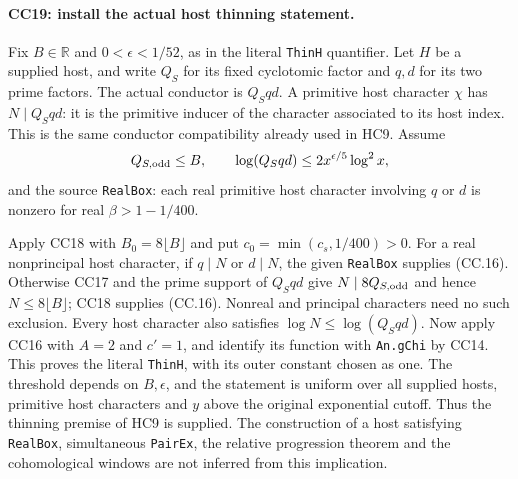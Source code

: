 \paragraph{CC19: install the actual host thinning statement.}
Fix $B\in\mathbb R$ and $0<\epsilon<1/52$, as in the
literal \texttt{ThinH} quantifier. Let $H$ be a supplied host,
and write $Q_S$ for its fixed
cyclotomic factor and $q,d$ for its two prime factors.
The actual conductor is $Q_Sqd$. A primitive host character
$\chi$ has $N\mid Q_Sqd$: it is the primitive inducer of
the character associated to its host index. This is the
same conductor compatibility already used in HC9.
Assume
\[
 Q_{S,\rm odd}\le B,\qquad
 \log(Q_Sqd)\le2x^{\epsilon/5}\log^2x,
\]
and the source \texttt{RealBox}: each real primitive host
character involving $q$ or $d$ is nonzero for real
$\beta>1-1/400$.

Apply CC18 with $B_0=8\lfloor B\rfloor$ and put
$c_0=\min(c_s,1/400)>0$.
For a real nonprincipal host character, if $q\mid N$ or
$d\mid N$, the given \texttt{RealBox} supplies (CC.16).
Otherwise CC17 and the prime support of $Q_Sqd$ give
$N\mid8Q_{S,\rm odd}$ and hence $N\le8\lfloor B\rfloor$;
CC18 supplies (CC.16). Nonreal and principal characters
need no such exclusion. Every host character also satisfies
$\log N\le\log(Q_Sqd)$.
Now apply CC16 with $A=2$ and $c'=1$, and identify its
function with \texttt{An.gChi} by CC14. This proves the
literal \texttt{ThinH}, with its outer constant chosen as one.
The threshold depends on $B,\epsilon$, and the statement is
uniform over all supplied hosts, primitive host characters
and $y$ above the original exponential cutoff.
Thus the thinning premise of HC9 is supplied. The construction
of a host satisfying \texttt{RealBox}, simultaneous
\texttt{PairEx}, the relative progression theorem and the
cohomological windows are not inferred from this implication.

